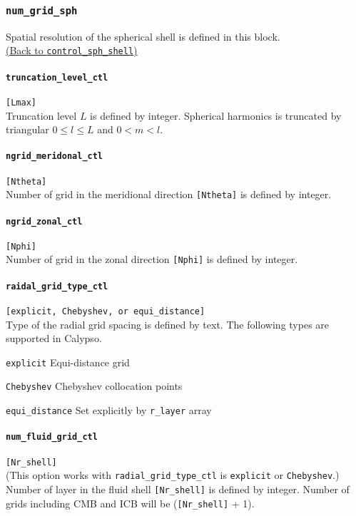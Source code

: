 \subsubsection{\tt num\_grid\_sph}
\label{href_t:num_grid_sph}
Spatial resolution of the spherical shell is defined in this block. \\
\hyperref[href_i:num_grid_sph]{(Back to {\tt control\_sph\_shell})}

\paragraph{\tt truncation\_level\_ctl}
\label{href_t:truncation_level_ctl}
\verb|[Lmax]| \\
Truncation level $L$ is defined by integer. Spherical harmonics is truncated by triangular $0 \le l \le L$ and $0 <m < l$.

\paragraph{\tt ngrid\_meridonal\_ctl}
\label{href_t:ngrid_meridonal_ctl}
\verb|[Ntheta]| \\
Number of grid in the meridional direction \verb|[Ntheta]| is defined by integer.

\paragraph{\tt ngrid\_zonal\_ctl}
\label{href_t:ngrid_zonal_ctl}
\verb|[Nphi]| \\
Number of grid in the zonal direction \verb|[Nphi]| is defined by integer.

\paragraph{\tt raidal\_grid\_type\_ctl}
\label{href_t:radial_grid_type_ctl}
\verb|[explicit, Chebyshev, or equi_distance]| \\
Type of the radial grid spacing is defined by text. The following types are supported in Calypso.
%
\begin{description}
	\item{\tt explicit}  Equi-distance grid
	\item{\tt Chebyshev} Chebyshev collocation points
	\item{\tt equi\_distance} Set explicitly by \verb|r_layer| array
\end{description}
%

\paragraph{\tt num\_fluid\_grid\_ctl}
\label{href_t:num_fluid_grid_ctl}
\verb|[Nr_shell]| \\
(This option works with \verb|radial_grid_type_ctl| is {\tt explicit} or {\tt Chebyshev}.)
Number of layer in the fluid shell \verb|[Nr_shell]| is defined by integer. Number of grids including CMB and ICB will be (\verb|[Nr_shell]| + 1).

